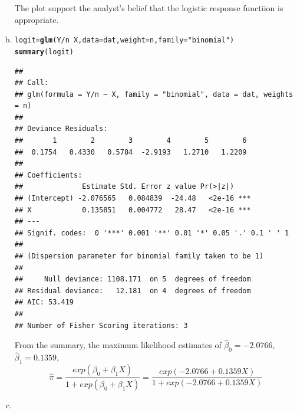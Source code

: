 \documentclass{article}\usepackage[]{graphicx}\usepackage[]{color}
\makeatletter
\newcommand{\hlstr}[1]{\textcolor[rgb]{0.192,0.494,0.8}{#1}}%
\newcommand{\hlopt}[1]{\textcolor[rgb]{0,0,0}{#1}}%
\newcommand{\hlstd}[1]{\textcolor[rgb]{0.345,0.345,0.345}{#1}}%
\newcommand{\hlkwb}[1]{\textcolor[rgb]{0.69,0.353,0.396}{#1}}%
\newcommand{\hlkwc}[1]{\textcolor[rgb]{0.333,0.667,0.333}{#1}}%
\newcommand{\hlkwd}[1]{\textcolor[rgb]{0.737,0.353,0.396}{\textbf{#1}}}%
\newenvironment{kframe}{%
 \def\at@end@of@kframe{}%
 \ifinner\ifhmode%
  \def\at@end@of@kframe{\end{minipage}}%
  \begin{minipage}{\columnwidth}%
 \fi\fi%
 \def\FrameCommand##1{\hskip\@totalleftmargin \hskip-\fboxsep
 \colorbox{shadecolor}{##1}\hskip-\fboxsep
     \hskip-\linewidth \hskip-\@totalleftmargin \hskip\columnwidth}%
 \MakeFramed {\advance\hsize-\width
   \@totalleftmargin\z@ \linewidth\hsize
   \@setminipage}}%
 {\par\unskip\endMakeFramed%
 \at@end@of@kframe}
\newenvironment{knitrout}{}{} %
\makeatother
\begin{document}
\begin{enumerate}[(a)]
\begin{knitrout}
\end{knitrout}

\qquad The plot support the analyst's belief that the logistic response functiion is appropriate.

\item

\begin{knitrout}
\color{fgcolor}\begin{kframe}
\begin{alltt}
  \hlstd{logit} \hlkwb{=} \hlkwd{glm}\hlstd{(Y}\hlopt{/}\hlstd{n} \hlopt{~} \hlstd{X,} \hlkwc{data} \hlstd{= dat,} \hlkwc{weight} \hlstd{= n ,} \hlkwc{family} \hlstd{=} \hlstr{"binomial"}\hlstd{)}
  \hlkwd{summary}\hlstd{(logit)}
\end{alltt}
\begin{verbatim}
## 
## Call:
## glm(formula = Y/n ~ X, family = "binomial", data = dat, weights = n)
## 
## Deviance Residuals: 
##       1        2        3        4        5        6  
##  0.1754   0.4330   0.5784  -2.9193   1.2710   1.2209  
## 
## Coefficients:
##              Estimate Std. Error z value Pr(>|z|)    
## (Intercept) -2.076565   0.084839  -24.48   <2e-16 ***
## X            0.135851   0.004772   28.47   <2e-16 ***
## ---
## Signif. codes:  0 '***' 0.001 '**' 0.01 '*' 0.05 '.' 0.1 ' ' 1
## 
## (Dispersion parameter for binomial family taken to be 1)
## 
##     Null deviance: 1108.171  on 5  degrees of freedom
## Residual deviance:   12.181  on 4  degrees of freedom
## AIC: 53.419
## 
## Number of Fisher Scoring iterations: 3
\end{verbatim}
\end{kframe}
\end{knitrout}

\qquad From the summary, the maximum likelihood estimates of $\hat{\beta}_0 = -2.0766$, $\hat{\beta}_1 = 0.1359$, $$\hat{\pi} = \frac{exp(\beta_0+\beta_1 X)}{1+exp(\beta_0+\beta_1 X)}=\frac{exp(-2.0766+0.1359 X)}{1+exp(-2.0766+0.1359 X)}$$

\item


\end{enumerate}
\end{document}

